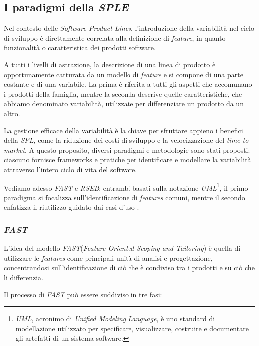 \documentclass[12pt]{report}
\newcommand{\sple}{\textsl{SPLE}\xspace}
\newcommand{\spl}{\textsl{SPL}\xspace}
\newcommand{\fast}{\textsl{FAST}\xspace}
\newcommand{\rseb}{\textsl{RSEB}\xspace}
\newcommand{\uml}{\textsl{UML}\xspace}
\begin{document}
\subsection{I paradigmi della \sple}
Nel contesto delle \textit{Software Product Lines}, l'introduzione della variabilità nel ciclo di sviluppo è direttamente correlata alla definizione di \textit{feature}, in quanto funzionalità o caratteristica dei prodotti software.

A tutti i livelli di astrazione, la descrizione di una linea di prodotto è opportunamente catturata da un modello di \textit{feature} e si compone di una parte costante e di una variabile. La prima è riferita a tutti gli aspetti che accomunano i prodotti della famiglia, mentre la seconda descrive quelle caratteristiche, che abbiamo denominato variabilità, utilizzate per differenziare un prodotto da un altro.

La gestione efficace della variabilità è la chiave per sfruttare appieno i benefici della \spl, come la riduzione dei costi di sviluppo e la velocizzazione del \textit{time-to-market}. A questo proposito, diversi paradigmi e metodologie sono stati proposti: ciascuno fornisce frameworks e pratiche per identificare e modellare la variabilità attraverso l'intero ciclo di vita del software.

Vediamo adesso \fast e \rseb: entrambi basati sulla notazione \uml\footnote{\uml, acronimo di \textit{Unified Modeling Language}, è uno standard di modellazione utilizzato per specificare, visualizzare, costruire e documentare gli artefatti di un sistema software.}, il primo paradigma si focalizza sull'identificazione di \textit{features} comuni, mentre il secondo enfatizza il riutilizzo guidato dai casi d'uso \cite{griss:favaro:alessandro, harsu}.


\subsubsection{\fast}
L'idea del modello \fast (\textit{Feature-Oriented Scoping and Tailoring}) \cite{harsu} è quella di utilizzare le \textit{features} come principali unità di analisi e progettazione, concentrandosi sull'identificazione di ciò che è condiviso tra i prodotti e su ciò che li differenzia.

Il processo di \fast può essere suddiviso in tre fasi:
\end{document}
